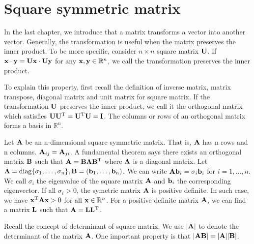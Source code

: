 \section{Square symmetric matrix}
In the last chapter, we introduce that a matrix transforms a vector into another vector. Generally, the transformation is useful when the matrix preserves the inner product. To be more specific, consider $ n \times n $ square matrix $\mathbf{U}$. If $ \mathbf{x} \cdot \mathbf{y} =  \mathbf{U}\mathbf{x} \cdot \mathbf{U}\mathbf{y}$ for any $\mathbf{x}, \mathbf{y} \in \mathbb{R}^n$, we call the transformation preserves the inner product.

To explain this property, first recall the definition of inverse matrix, matrix transpose, diagonal matrix and unit matrix for square matrix. If the transformation $\mathbf{U}$ preserves the inner product, 
we call it the orthogonal matrix which satisfies $\mathbf{U}\mathbf{U}^{\mathrm{T}} = \mathbf{U}^{\mathrm{T}}\mathbf{U}= \mathbf{I}$. The columns or rows of an orthogonal matrix forms a basis in $\mathbb{R}^n$.

Let $\mathbf{A}$ be an n-dimensional square symmetric matrix. That is, $\mathbf{A}$ has n rows and n columns. $\mathbf{A}_{ij} = \mathbf{A}_{ji}$. A fundamental theorem says there exists an orthogonal matrix $\mathbf{B}$ such that 
$\mathbf{A} = \mathbf{B} \mathbf{\Lambda} \mathbf{B}^{\mathrm{T}}$ where $\mathbf{\Lambda}$ is a diagonal matrix. Let $ \mathbf{\Lambda} = \operatorname{diag}\{ \sigma_1, \dots, \sigma_n \}, \mathbf{B} =  (\mathbf{b}_1, \dots, \mathbf{b}_n)$. We can write $\mathbf{A} \mathbf{b}_i = \sigma_i\mathbf{b}_i $ for $i=1, \dots, n $. We call $\sigma_i$ the eigenvalue of the square matrix $\mathbf{A}$ and $\mathbf{b}_i$ the corresponding eigenvector. If all $\sigma_i > 0$, the symetric matrix $\mathbf{A}$ is positive definite. In such case, we have $\mathbf{x}^{\mathrm{T}} \mathbf{A} \mathbf{x} > 0$ for all $\mathbf{x} \in \mathbb{R}^n$. For a positive definite matrix $\mathbf{A}$, we can find a matrix $\mathbf{L}$ such that $\mathbf{A} = \mathbf{L}\mathbf{L}^{\mathrm{T}} $.

Recall the concept of determinant of square matrix. We use $\lvert\mathbf{A}\rvert$ to denote the determinant of the matrix $\mathbf{A}$.
One important property is that $\lvert\mathbf{A}\mathbf{B}\rvert = \lvert\mathbf{A}\rvert\lvert\mathbf{B}\rvert$.


